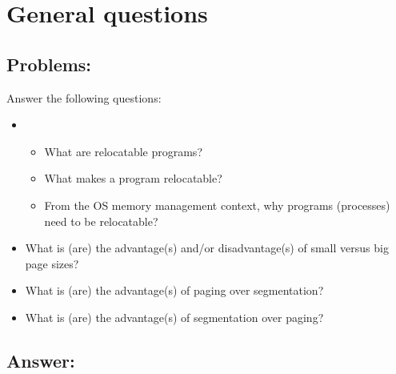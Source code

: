 \newpage
\section{General questions}
\subsection{Problems:}
Answer the following questions:
\begin{itemize}
    \item 
        \begin{itemize}
            \item What are relocatable programs?
            \item What makes a program relocatable? 
            \item From the OS memory management context, why programs (processes) need to be relocatable?
        \end{itemize}
    \item What is (are) the advantage(s) and/or disadvantage(s) of small versus big page sizes?
    \item What is (are) the advantage(s) of paging over segmentation?
    \item What is (are) the advantage(s) of segmentation over paging?
\end{itemize}

\subsection{Answer:}


